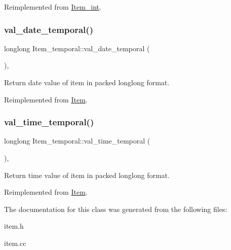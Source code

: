 Reimplemented from \mbox{\hyperlink{classItem__int_a61fc7a6461f8d3f027fc91b5aeca8d1b}{Item\+\_\+int}}.

\mbox{\label{classItem__temporal_a3af452477612ee734dbee3b4b206b14f}} 
\subsubsection{\texorpdfstring{val\+\_\+date\+\_\+temporal()}{val\_date\_temporal()}}
{\footnotesize\ttfamily longlong Item\+\_\+temporal\+::val\+\_\+date\+\_\+temporal (\begin{DoxyParamCaption}{ }\end{DoxyParamCaption})\hspace{0.3cm}{\ttfamily [inline]}, {\ttfamily [virtual]}}

Return date value of item in packed longlong format. 

Reimplemented from \mbox{\hyperlink{classItem_a9174217a46706eb2db74689b5365c4a5}{Item}}.

\mbox{\label{classItem__temporal_ac5adb00cf4d1f565f7b858bef7c0a968}} 
\subsubsection{\texorpdfstring{val\+\_\+time\+\_\+temporal()}{val\_time\_temporal()}}
{\footnotesize\ttfamily longlong Item\+\_\+temporal\+::val\+\_\+time\+\_\+temporal (\begin{DoxyParamCaption}{ }\end{DoxyParamCaption})\hspace{0.3cm}{\ttfamily [inline]}, {\ttfamily [virtual]}}

Return time value of item in packed longlong format. 

Reimplemented from \mbox{\hyperlink{classItem_a69ef60a3917a1bb4832498a695754c58}{Item}}.



The documentation for this class was generated from the following files\+:\begin{DoxyCompactItemize}
\item 
item.\+h\item 
item.\+cc\end{DoxyCompactItemize}
